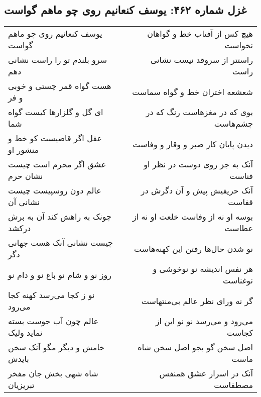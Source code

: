 \begin{center}
\section*{غزل شماره ۴۶۲: یوسف کنعانیم روی چو ماهم گواست}
\label{sec:0462}
\begin{longtable}{l p{0.5cm} r}
یوسف کنعانیم روی چو ماهم گواست
&&
هیچ کس از آفتاب خط و گواهان نخواست
\\
سرو بلندم تو را راست نشانی دهم
&&
راستتر از سروقد نیست نشانی راست
\\
هست گواه قمر چستی و خوبی و فر
&&
شعشعه اختران خط و گواه سماست
\\
ای گل و گلزارها کیست گواه شما
&&
بوی که در مغزهاست رنگ که در چشم‌هاست
\\
عقل اگر قاضیست کو خط و منشور او
&&
دیدن پایان کار صبر و وقار و وفاست
\\
عشق اگر محرم است چیست نشان حرم
&&
آنک به جز روی دوست در نظر او فناست
\\
عالم دون روسپیست چیست نشانی آن
&&
آنک حریفیش پیش و آن دگرش در قفاست
\\
چونک به راهش کند آن به برش درکشد
&&
بوسه او نه از وفاست خلعت او نه از عطاست
\\
چیست نشانی آنک هست جهانی دگر
&&
نو شدن حال‌ها رفتن این کهنه‌هاست
\\
روز نو و شام نو باغ نو و دام نو
&&
هر نفس اندیشه نو نوخوشی و نوغناست
\\
نو ز کجا می‌رسد کهنه کجا می‌رود
&&
گر نه ورای نظر عالم بی‌منتهاست
\\
عالم چون آب جوست بسته نماید ولیک
&&
می‌رود و می‌رسد نو نو این از کجاست
\\
خامش و دیگر مگو آنک سخن بایدش
&&
اصل سخن گو بجو اصل سخن شاه ماست
\\
شاه شهی بخش جان مفخر تبریزیان
&&
آنک در اسرار عشق همنفس مصطفاست
\\
\end{longtable}
\end{center}
